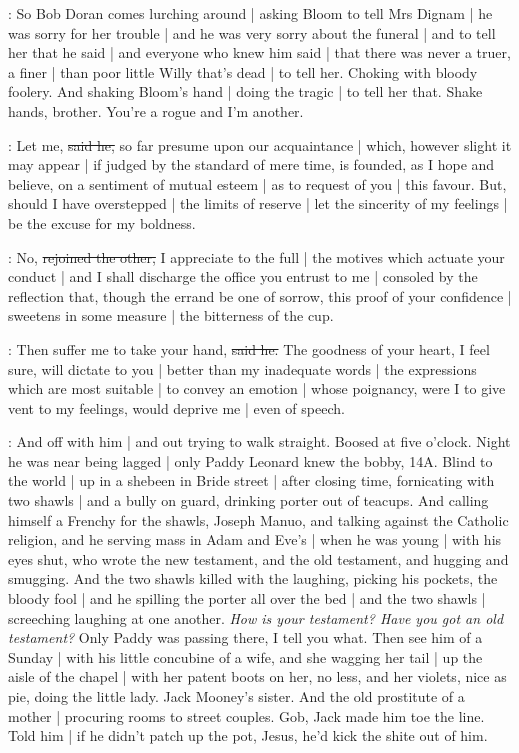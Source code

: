 \Nq:
So Bob Doran comes lurching around
 |
asking Bloom to tell Mrs Dignam |
he was sorry for her trouble |
and he was very sorry about the funeral |
and to tell her that he said |
and everyone who knew him said |
that there was never a truer,
a finer |
than poor little Willy that's dead |
to tell her.
Choking with bloody foolery.
And shaking Bloom's hand |
doing the tragic |
to tell her that.
Shake hands,
brother.
You're a rogue and I'm another.

\doran:
Let me,
\sout{said he,}
so far presume upon our acquaintance |
which,
however slight it may appear |
if judged by the standard of mere time,
is founded,
as I hope and believe,
on a sentiment of mutual esteem |
as to request of you |
this favour.
But,
should I have overstepped |
the limits of reserve |
let the sincerity of my feelings
 |
be the excuse for my boldness.

\Bloom:
No,
\sout{rejoined the other,}
I appreciate to the full |
the motives which actuate your conduct |
and I shall discharge the office you entrust to me |
consoled by the reflection that,
though the errand be one of sorrow,
this proof of your confidence |
sweetens in some measure |
the bitterness of the cup.

\doran:
Then suffer me to take your hand,
\sout{said he.}
The goodness of your heart,
I feel sure,
will dictate to you |
better than my inadequate words |
the expressions which are most suitable |
to convey an emotion |
whose poignancy,
were I to give vent to my feelings,
would deprive me |
even of speech.

\Nq:
And off with him |
and out trying to walk straight.
Boosed at five o'clock.
Night he was near being lagged |
only Paddy Leonard knew the bobby,
14A.
Blind to the world |
up in a shebeen in Bride street |
after closing time,
fornicating with two shawls |
and a bully on guard,
drinking porter out of teacups.
And calling himself a Frenchy for the shawls,
Joseph Manuo,
and talking against the Catholic religion,
and he serving mass in Adam and Eve's |
when he was young |
with his eyes shut,
who wrote the new testament,
and the old testament,
and hugging and smugging.
And the two shawls killed with the laughing,
picking his pockets,
the bloody fool |
and he spilling the porter all over the bed |
and the two shawls |
screeching laughing at one another.%
\emph{How is your testament?
Have you got an old testament?}
Only Paddy was passing there,
I tell you what.
Then see him of a Sunday |
with his little concubine of a wife,
and she wagging her tail |
up the aisle of the chapel |
with her patent boots on her,
no less,
and her violets,
nice as pie,
doing the little lady.
Jack Mooney's sister.
And the old prostitute of a mother |
procuring rooms to street couples.
Gob,
Jack made him toe the line.
Told him |
if he didn't patch up the pot,
Jesus,
he'd kick the shite out of him.

